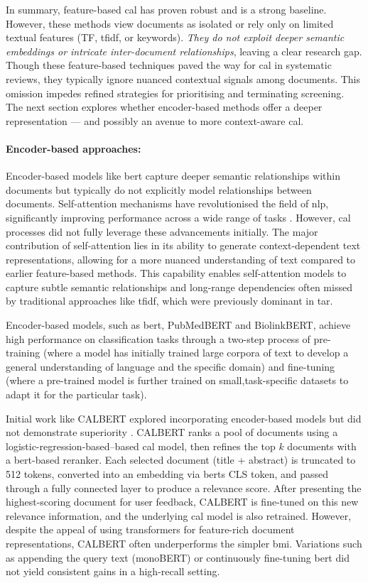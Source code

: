 \documentclass[10pt,oneside]{book}
\begin{document}
In summary, feature-based \gls*{cal} has proven robust and is a strong baseline.  However, these methods view documents as isolated or rely only on limited textual features (TF, \gls*{tfidf}, or keywords). \emph{They do not exploit deeper semantic embeddings or intricate inter-document relationships}, leaving a clear research gap. Though these feature-based techniques paved the way for \gls*{cal} in systematic reviews, they typically ignore nuanced contextual signals among documents. This omission impedes refined strategies for prioritising and terminating screening. The next section explores whether encoder-based methods offer a deeper representation — and possibly an avenue to more context-aware \gls*{cal}.

\paragraph{Encoder-based approaches:}
Encoder-based models like \gls*{bert} capture deeper semantic relationships within documents but typically do not explicitly model relationships between documents. Self-attention mechanisms have revolutionised the field of \gls*{nlp}, significantly improving performance across a wide range of tasks \cite{vaswani_attention_2023}. However, \gls*{cal} processes did not fully leverage these advancements initially. The major contribution of self-attention lies in its ability to generate context-dependent text representations, allowing for a more nuanced understanding of text compared to earlier feature-based methods. This capability enables self-attention models to capture subtle semantic relationships and long-range dependencies often missed by traditional approaches like \gls*{tfidf}, which were previously dominant in \gls*{tar}.

Encoder-based models, such as \gls*{bert}, PubMedBERT and BiolinkBERT, achieve high performance on classification tasks through a two-step process of pre-training (where a model has initially trained large corpora of text to develop a general understanding of language and the specific domain) and fine-tuning (where a pre-trained model is further trained on small,task-specific datasets to adapt it for the particular task). 

Initial work like CALBERT explored incorporating encoder-based models but did not demonstrate superiority \cite{sadri_continuous_2022}. CALBERT ranks a pool of documents using a logistic-regression-based–based \gls*{cal} model, then refines the top $k$ documents with a \gls*{bert}-based reranker. Each selected document (title + abstract) is truncated to 512 tokens, converted into an embedding via \glspl*{bert}  CLS token, and passed through a fully connected layer to produce a relevance score. After presenting the highest-scoring document for user feedback, CALBERT is fine-tuned on this new relevance information, and the underlying \gls*{cal} model is also retrained. However, despite the appeal of using transformers for feature-rich document representations, CALBERT often underperforms the simpler \gls*{bmi}. Variations such as appending the query text (monoBERT) or continuously fine-tuning \gls*{bert} did not yield consistent gains in a high-recall setting. 
\end{document}
